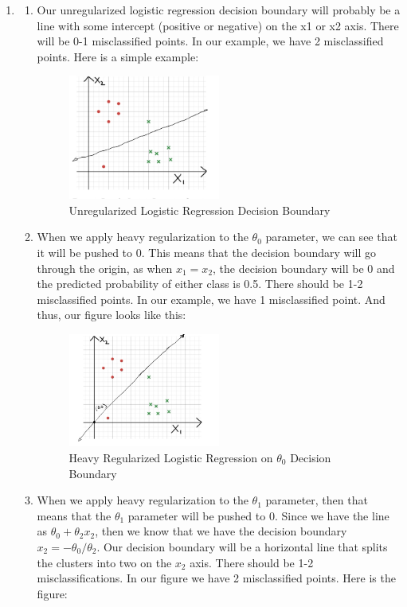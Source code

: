 \documentclass[12pt]{article}
\begin{document}
\begin{enumerate}
\item 
\begin{enumerate}
\item Our unregularized logistic regression decision boundary will probably be a line with some intercept (positive or negative) on the x1 or x2 axis. There will be 0-1 misclassified points. In our example, we have 2 misclassified points. Here is a simple example: \\ 

\begin{figure}[H]
  \centering
  \includegraphics[width=0.5\textwidth]{1_a.jpeg}
  \caption{Unregularized Logistic Regression Decision Boundary}
\end{figure}
\item When we apply heavy regularization to the $\theta_0$ parameter, we can see that it will be pushed to 0. This means that the decision boundary will go through the origin, as when $x_1 = x_2$, the decision boundary will be 0 and the predicted probability of either class is 0.5. There should be 1-2 misclassified points. In our example, we have 1 misclassified point. And thus, our figure looks like this: \\ 
\begin{figure}[H]
  \centering
  \includegraphics[width=0.5\textwidth]{1_b.jpeg}
  \caption{Heavy Regularized Logistic Regression on $\theta_0$ Decision Boundary}
\end{figure}
\item When we apply heavy regularization to the $\theta_1$ parameter, then that means that the $\theta_1$ parameter will be pushed to 0. Since we have the line as $\theta_0 + \theta_2 x_2$, then we know that we have the decision boundary $x_2 = -\theta_0/\theta_2$. Our decision boundary will be a horizontal line that splits the clusters into two on the $x_2$ axis. There should be 1-2 misclassifications. In our figure we have 2 misclassified points. Here is the figure: \\ 

\end{enumerate}
\end{enumerate}
\end{document}
